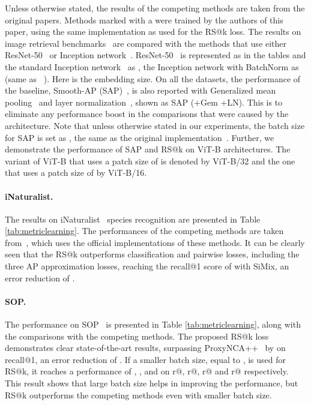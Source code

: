 Unless otherwise stated, the results of the competing methods are taken from the original papers. Methods marked with a  were trained by the authors of this paper, using the same implementation as used for the RS@k loss. The results on image retrieval benchmarks~\cite{ksd+13,ohb16,ltw+16,vms+18} are compared with the methods that use either ResNet-50~\cite{hzr+16} or Inception network~\cite{slj+15}. ResNet-50~\cite{hzr+16} is represented as  in the tables and the standard Inception network~\cite{slj+15} as , the Inception network with BatchNorm as   (same as ~\cite{tdt20}). Here  is the embedding size. On all the datasets, the performance of the baseline, Smooth-AP (SAP)~\cite{bxk+20}, is also reported with Generalized mean pooling~\cite{rtc19} and layer normalization~\cite{bkh+16}, shown as SAP\textsuperscript{\dag} (+Gem +LN). This is to eliminate any performance boost in the comparisons that were caused by the architecture. Note that unless otherwise stated in our experiments, the batch size for SAP is set as , the same as the original implementation~\cite{bxk+20}. Further, we demonstrate the performance of SAP and RS@k on ViT-B architectures. The variant of ViT-B that uses a patch size of  is denoted by ViT-B/32 and the one that uses a patch size of  by ViT-B/16.

\paragraph{iNaturalist.} The results on iNaturalist~\cite{vms+18} species recognition are presented in Table \ref{tab:metriclearning}. The performances of the competing methods are taken from~\cite{bxk+20}, which uses the official implementations of these methods. It can be clearly seen that the RS@k outperforms classification and pairwise losses, including the three AP approximation losses, reaching the recall@1 score of  with SiMix, an error reduction of .

\paragraph{SOP.} The performance on SOP~\cite{ohb16} is presented in Table \ref{tab:metriclearning}, along with the comparisons with the competing methods. The proposed RS@k loss demonstrates clear state-of-the-art results, surpassing ProxyNCA++~\cite{tdt20} by  on recall@1, an error reduction of . If a smaller batch size, equal to , is used for RS@k, it reaches a performance of , ,  and  on r@, r@, r@ and r@ respectively. This result shows that large batch size helps in improving the performance, but RS@k outperforms the competing methods even with smaller batch size.


